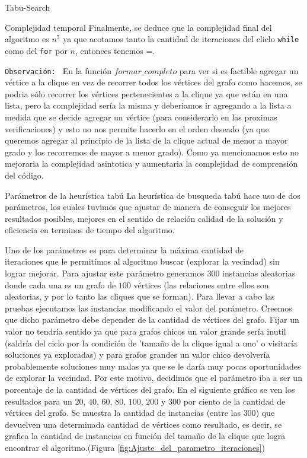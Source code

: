 \begin{section}{Tabu-Search}
\begin{subsection}{Complejidad temporal}
			 Finalmente, se deduce que la complejidad final del algoritmo es $n^5$ ya que acotamos tanto la cantidad de iteraciones del cliclo \texttt{while} como del \texttt{for} por $n$, entonces tenemos =.\Pa
			 
			 \texttt{Observación: } En la función $formar\_completo$ para ver si es factible agregar un vértice a la clique en vez de recorrer todos los vértices del grafo como hacemos, se podria sólo recorrer los vértices pertenecientes a la clique ya que están en una lista, pero la complejidad sería la misma y deberiamos ir agregando a la lista a medida que se decide agregar un vértice (para considerarlo en las proximas verificaciones) y esto no nos permite hacerlo en el orden deseado (ya que queremos agregar al principio de la lista de la clique actual de menor a mayor grado y los recorremos de mayor a menor grado). Como ya mencionamos esto no mejoraria la complejidad asintotica y aumentaria la complejidad de comprensión del código.
	\end{subsection}

	\begin{subsection}{Parámetros de la heurística tabú}
		La heurística de busqueda tabú hace uso de dos parámetros, los cuales tuvimos que ajustar de manera de conseguir los mejores resultados posibles, mejores en el sentido de relación calidad de la solución y eficiencia en terminos de tiempo del algoritmo.

		Uno de los parámetros es para determinar la máxima cantidad de\\ iteraciones que le permitimos al algoritmo buscar (explorar la vecindad) sin lograr mejorar. Para ajustar este parámetro generamos $300$ instancias aleatorias donde cada una es un grafo de $100$ vértices (las relaciones entre ellos son aleatorias, y por lo tanto las cliques que se forman). Para llevar a cabo las pruebas ejecutamos las instancias modificando el valor del parámetro. Creemos que dicho parámetro debe depender de la cantidad de vértices del grafo. Fijar un valor no tendría sentido ya que para grafos chicos un valor grande sería inutil (saldría del ciclo por la condición de 'tamaño de la clique igual a uno' o visitaría soluciones ya exploradas) y para grafos grandes un valor chico devolvería probablemente soluciones muy malas ya que se le daría muy pocas oportunidades de explorar la vecindad. Por este motivo, decidimos que el parámetro iba a ser un porcentaje de la cantidad de vértices del grafo. En el siguiente gráfico se ven los resultados para un $20$, $40$, $60$, $80$, $100$, $200$ y $300$ por ciento de la cantidad de vértices del grafo. Se muestra la cantidad de instancias (entre las $300$) que devuelven una determinada cantidad de vértices como resultado, es decir, se grafica la cantidad de instancias en función del tamaño de la clique que logra encontrar el algoritmo.(Figura \ref{fig:Ajuste_del_parametro_iteraciones})


\end{subsection}
\end{section}
